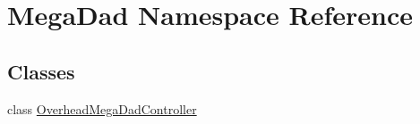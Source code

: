 \hypertarget{namespace_mega_dad}{}\section{Mega\+Dad Namespace Reference}
\label{namespace_mega_dad}
\subsection*{Classes}
\begin{DoxyCompactItemize}
\item 
class \mbox{\hyperlink{class_mega_dad_1_1_overhead_mega_dad_controller}{Overhead\+Mega\+Dad\+Controller}}
\end{DoxyCompactItemize}
